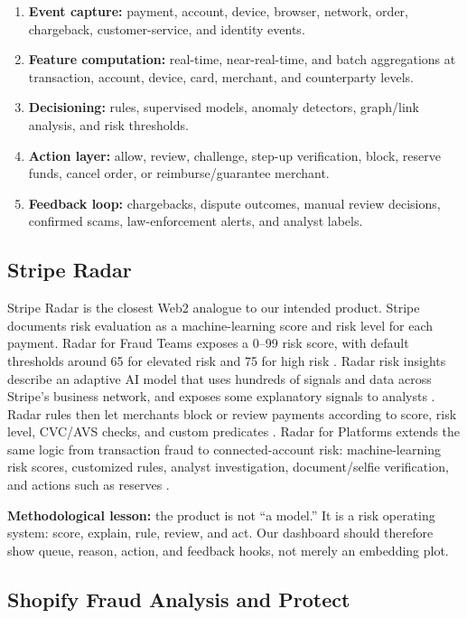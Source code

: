 \documentclass[11pt]{article}
\begin{document}
\begin{enumerate}
  \item \textbf{Event capture:} payment, account, device, browser, network,
        order, chargeback, customer-service, and identity events.
  \item \textbf{Feature computation:} real-time, near-real-time, and batch
        aggregations at transaction, account, device, card, merchant, and
        counterparty levels.
  \item \textbf{Decisioning:} rules, supervised models, anomaly detectors,
        graph/link analysis, and risk thresholds.
  \item \textbf{Action layer:} allow, review, challenge, step-up verification,
        block, reserve funds, cancel order, or reimburse/guarantee merchant.
  \item \textbf{Feedback loop:} chargebacks, dispute outcomes, manual review
        decisions, confirmed scams, law-enforcement alerts, and analyst labels.
\end{enumerate}

\subsection{Stripe Radar}

Stripe Radar is the closest Web2 analogue to our intended product.  Stripe
documents risk evaluation as a machine-learning score and risk level for each
payment.  Radar for Fraud Teams exposes a 0--99 risk score, with default
thresholds around 65 for elevated risk and 75 for high risk \cite{stripeRisk}.
Radar risk insights describe an adaptive AI model that uses hundreds of
signals and data across Stripe's business network, and exposes some explanatory
signals to analysts \cite{stripeInsights}.  Radar rules then let merchants
block or review payments according to score, risk level, CVC/AVS checks, and
custom predicates \cite{stripeRules}.  Radar for Platforms extends the same
logic from transaction fraud to connected-account risk: machine-learning risk
scores, customized rules, analyst investigation, document/selfie verification,
and actions such as reserves \cite{stripePlatforms}.

\textbf{Methodological lesson:} the product is not ``a model.''  It is a
risk operating system: score, explain, rule, review, and act.  Our dashboard
should therefore show queue, reason, action, and feedback hooks, not merely an
embedding plot.

\subsection{Shopify Fraud Analysis and Protect}
\end{document}
